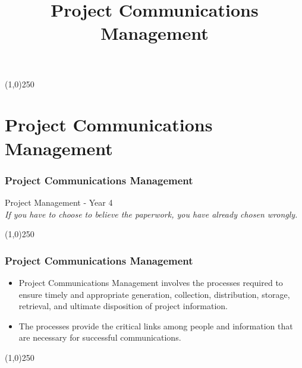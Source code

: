 




\title[Project Management]{Project Communications Management}




%
\usetikzlibrary{arrows}

\tableofcontents
\newpage



\begin{frame}
\titlepage
\end{frame}\begin{center}\line(1,0){250}\end{center}
%
%


\section{Project Communications Management}



\begin{frame}
\frametitle{Project Communications Management}
Project Management - Year 4\\
\textit{If you have to choose to believe the paperwork, you have already chosen wrongly.}\\
\end{frame}\begin{center}\line(1,0){250}\end{center}


\begin{frame}
\frametitle{Project Communications Management}
\begin{itemize}
	\item Project Communications Management involves the processes required to ensure timely and appropriate generation, collection, distribution, storage, retrieval, and ultimate disposition of project information.
	\item The processes provide the critical links among people and information that are necessary for successful communications.
\end{itemize}
\end{frame}\begin{center}\line(1,0){250}\end{center}


